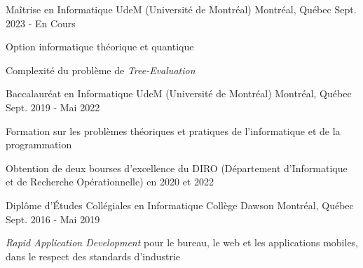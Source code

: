 

\begin{cventries}

  \cventry
    {Maîtrise en Informatique} %
    {UdeM (Université de Montréal)} %
    {Montréal, Québec} %
    {Sept. 2023 - En Cours} %
    {
      \begin{cvitems} %
        \item {Option informatique théorique et quantique}
        \item {Complexité du problème de \textit{Tree-Evaluation}}
      \end{cvitems}
    }
    
  \cventry
    {Baccalauréat en Informatique} %
    {UdeM (Université de Montréal)} %
    {Montréal, Québec} %
    {Sept. 2019 - Mai 2022} %
    {
      \begin{cvitems} %
        \item {Formation sur les problèmes théoriques et pratiques de l'informatique et de la programmation}
        \item {Obtention de deux bourses d'excellence du DIRO (Département d'Informatique et de Recherche Opérationnelle) en 2020 et 2022}
      \end{cvitems}
    }
    
  \cventry
    {Diplôme d'Études Collégiales en Informatique} %
    {Collège Dawson} %
    {Montréal, Québec} %
    {Sept. 2016 - Mai 2019} %
    {
      \begin{cvitems} %
        \item {\textit{Rapid Application Development} pour le bureau, le web et les applications mobiles, dans le respect des standards d'industrie}
      \end{cvitems}
    }

\end{cventries}
